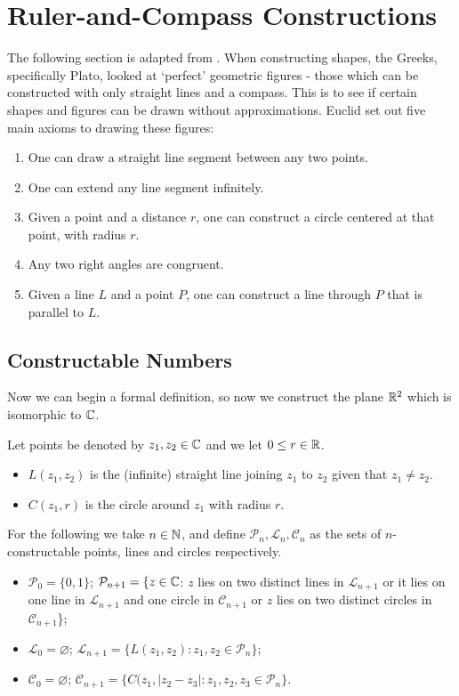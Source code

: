 \section{Ruler-and-Compass Constructions} \label{sec:applications}

The following section is adapted from \cite{Stewart, shape-constructions}. When constructing shapes, the Greeks, specifically Plato, looked at `perfect' geometric figures - those which can be constructed with only straight lines and a compass. This is to see if certain shapes and figures can be drawn without approximations. Euclid set out five main axioms to drawing these figures:

\begin{enumerate}
    \item One can draw a straight line segment between any two points.
    \item One can extend any line segment infinitely.
    \item Given a point and a distance $r$, one can construct a circle centered at that point, with radius $r$.
    \item Any two right angles are congruent.
    \item Given a line $L$ and a point $P$, one can construct a line through $P$ that is parallel to $L$. 
\end{enumerate}

\subsection{Constructable Numbers}

Now we can begin a formal definition, so now we construct the plane $\mathbb R^2$ which is isomorphic to $\mathbb C$. 
\begin{definition}
Let points be denoted by $z_1,z_2 \in \mathbb C$ and we let $0\leq r \in \mathbb R$.
    \begin{itemize}
        \item $L(z_1,z_2)$ is the (infinite) straight line joining $z_1$ to $z_2$ given that $z_1 \neq z_2$. 
        \item $C(z_1,r)$ is the circle around $z_1$ with radius $r$.
    \end{itemize}
    For the following we take $n \in \mathbb N$, and define $\mathcal{P}_n,\mathcal{L}_n,\mathcal{C}_n$ as the sets of $n$-constructable points, lines and circles respectively.
    \begin{itemize}
        \item $\mathcal{P}_0=\{0,1\}$; $\mathcal{P}_{n+1}=\{z\in \mathbb C $: $z$ lies on two distinct lines in $\mathcal{L}_{n+1}$ or it lies on one line in $\mathcal{L}_{n+1}$ and one circle in $\mathcal{C}_{n+1}$ or $z$ lies on two distinct circles in $\mathcal{C}_{n+1}$\};
        \item $\mathcal{L}_0=\varnothing$; $\mathcal{L}_{n+1}=\{L(z_1,z_2) : z_1,z_2\in \mathcal{P}_n\}$;
        \item $\mathcal{C}_0=\varnothing$; $\mathcal{C}_{n+1}=\{C(z_1,|z_2-z_3|:z_1,z_2,z_3\in \mathcal{P}_n\}$.
    \end{itemize}
\end{definition}

